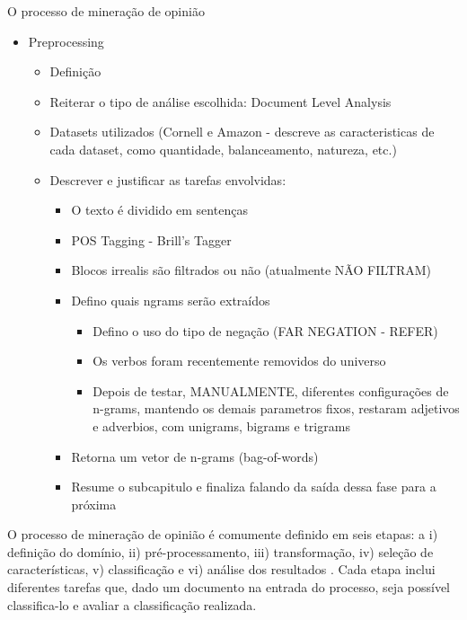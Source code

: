 
O processo de mineração de opinião
\begin{itemize}

\item Preprocessing
\begin{itemize}
\item Definição
\item Reiterar o tipo de análise escolhida: Document Level Analysis
\item Datasets utilizados (Cornell e Amazon - descreve as caracteristicas de cada dataset, como quantidade, balanceamento, natureza, etc.)

\item Descrever e justificar as tarefas envolvidas:
\begin{itemize}
\item O texto é dividido em sentenças
\item POS Tagging - Brill's Tagger
\item Blocos irrealis são filtrados ou não (atualmente NÃO FILTRAM)
\item Defino quais ngrams serão extraídos
\begin{itemize}
\item Defino o uso do tipo de negação (FAR NEGATION - REFER)
\item Os verbos foram recentemente removidos do universo
\item Depois de testar, MANUALMENTE, diferentes configurações de n-grams, mantendo os demais parametros fixos, restaram adjetivos e adverbios, com unigrams, bigrams e trigrams
\end{itemize}

\item Retorna um vetor de n-grams (bag-of-words)
\item Resume o subcapitulo e finaliza falando da saída dessa fase para a próxima
\end{itemize}
\end{itemize}
\end{itemize}

O processo de mineração de opinião é comumente definido em seis etapas: a i) definição do domínio, ii) pré-processamento, iii) transformação, iv) seleção de características, v) classificação e vi) análise dos resultados \cite{moraes2012document}. Cada etapa inclui diferentes tarefas que, dado um documento na entrada do processo, seja possível classifica-lo e avaliar a classificação realizada.

